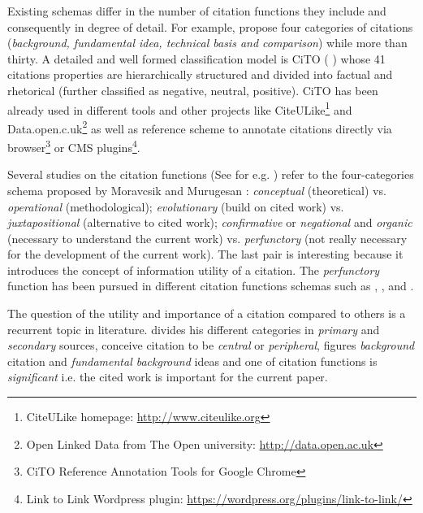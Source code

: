 \documentclass[runningheads,a4paper]{llncs}
\begin{document}
Existing schemas differ in the number of citation functions they include and consequently in degree of detail. For example,  \cite{__RefNumPara__4483_348126194} propose four categories of citations ({\em background, fundamental idea, technical basis and comparison}) while  \cite{__RefNumPara__3011_348126194} more than thirty. A detailed and well formed classification model is CiTO ( \cite{__RefNumPara__4485_348126194}) whose 41 citations properties are hierarchically structured and divided into factual and rhetorical (further classified as negative, neutral, positive). CiTO has been already used in different tools and other projects like CiteULike\footnote{CiteULike homepage: \url{http://www.citeulike.org}} and Data.open.c.uk\footnote{Open Linked Data from The Open university: \url{http://data.open.ac.uk}} as well as reference scheme to annotate citations directly via browser\footnote{CiTO Reference Annotation Tools for Google Chrome} or CMS plugins\footnote{Link to Link Wordpress plugin: \url{https://wordpress.org/plugins/link-to-link/}}.

Several studies on the citation functions (See for e.g.  \cite{__RefNumPara__4487_348126194}) refer to the four-categories schema proposed by Moravcsik and Murugesan  \cite{__RefNumPara__4489_348126194} : {\em conceptual} (theoretical) vs. {\em operational} (methodological); {\em evolutionary} (build on cited work) vs. {\em juxtapositional} (alternative to cited work); {\em confirmative} or {\em negational} and {\em organic} (necessary to understand the current work) vs. {\em perfunctory} (not really necessary for the development of the current work). The last pair is interesting because it introduces the concept of information utility of a citation. The {\em perfunctory }function has been pursued in different citation functions schemas such as  \cite{__RefHeading__17516_1088465736},  \cite{__RefNumPara__3009_348126194},  \cite{__RefNumPara__3011_348126194} and  \cite{__RefNumPara__4557_348126194} .

The question of the utility and importance of a citation compared to others is a recurrent topic in literature.  \cite{__RefNumPara__4559_348126194} divides his different categories in {\em primary} and {\em secondary} sources,  \cite{__RefNumPara__4561_348126194} conceive citation to be {\em central} or {\em peripheral},  \cite{__RefNumPara__4483_348126194} figures {\em background} citation and {\em fundamental background} ideas and one of  \cite{__RefNumPara__4563_348126194} citation functions is {\em significant} i.e. the cited work is important for the current paper.
\end{document}
